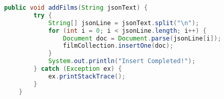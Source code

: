 \begin{lstlisting}[language=Java,  basicstyle=\footnotesize]
	public void addFilms(String jsonText) {
		try {
			String[] jsonLine = jsonText.split("\n");
			for (int i = 0; i < jsonLine.length; i++) {
				Document doc = Document.parse(jsonLine[i]);
				filmCollection.insertOne(doc);
			}
			System.out.println("Insert Completed!");
		} catch (Exception ex) {
			ex.printStackTrace();
		}
	}
\end{lstlisting}